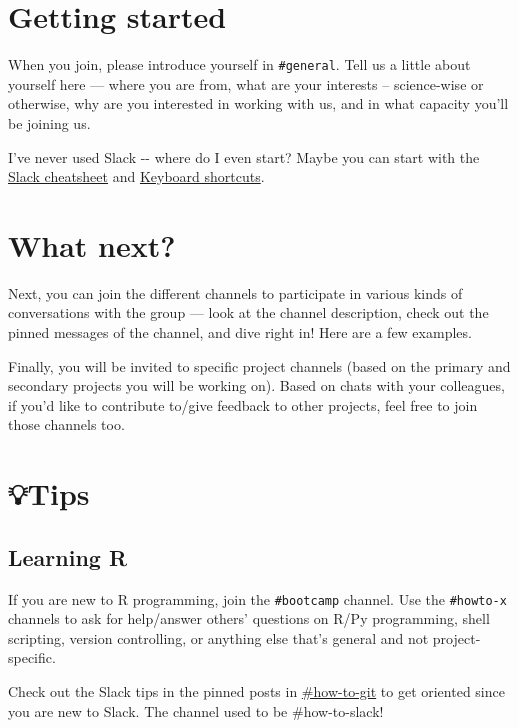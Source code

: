 \documentclass[
  letterpaper,
  DIV=11,
  numbers=noendperiod]{scrreprt}
\begin{document}
\hypertarget{getting-started}{%
\section{Getting started}\label{getting-started}}

When you join, please introduce yourself in \texttt{\#general}. Tell us
a little about yourself here --- where you are from, what are your
interests -- science-wise or otherwise, why are you interested in
working with us, and in what capacity you'll be joining us.

I've never used Slack -\/- where do I even start? Maybe you can start
with the
\href{https://github.com/JRaviLab/cheatsheets/blob/master/slack-misc/slack-cheatsheet.pdf}{Slack
cheatsheet} and
\href{https://slack.com/help/articles/201374536-Slack-keyboard-shortcuts}{Keyboard
shortcuts}.

\hypertarget{what-next}{%
\section{What next?}\label{what-next}}

Next, you can join the different channels to participate in various
kinds of conversations with the group --- look at the channel
description, check out the pinned messages of the channel, and dive
right in! Here are a few examples.

Finally, you will be invited to specific project channels (based on the
primary and secondary projects you will be working on). Based on chats
with your colleagues, if you'd like to contribute to/give feedback to
other projects, feel free to join those channels too.

\hypertarget{tips}{%
\section{💡Tips}\label{tips}}

\hypertarget{learning-r}{%
\subsection{Learning R}\label{learning-r}}

If you are new to R programming, join the \texttt{\#bootcamp} channel.
Use the \texttt{\#howto-x} channels to ask for help/answer others'
questions on R/Py programming, shell scripting, version controlling, or
anything else that's general and not project-specific.

Check out the Slack tips in the pinned posts in
\href{https://jravilab.slack.com/archives/CATMCKFT9}{\#how-to-git} to
get oriented since you are new to Slack. The channel used to be
\#how-to-slack!
\end{document}
